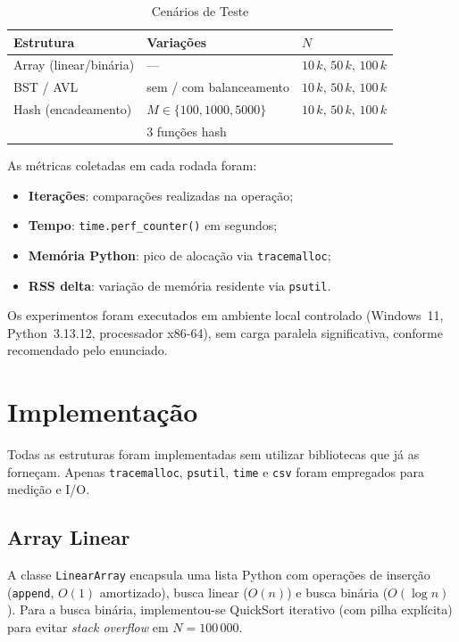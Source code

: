 \documentclass[conference,a4paper]{IEEEtran}
\begin{document}
\begin{table}[htbp]
  \caption{Cenários de Teste}
  \label{tab:cenarios}
  \centering
  \begin{tabular}{lll}
    \toprule
    Estrutura & Variações & $N$ \\
    \midrule
    Array (linear/binária) & — & $10\,k,\,50\,k,\,100\,k$ \\
    BST / AVL              & sem / com balanceamento & $10\,k,\,50\,k,\,100\,k$ \\
    Hash (encadeamento)    & $M \in \{100,1000,5000\}$ & $10\,k,\,50\,k,\,100\,k$ \\
                           & 3 funções hash & \\
    \bottomrule
  \end{tabular}
\end{table}

As métricas coletadas em cada rodada foram:

\begin{itemize}
  \item \textbf{Iterações}: comparações realizadas na operação;
  \item \textbf{Tempo}: \texttt{time.perf\_counter()} em segundos;
  \item \textbf{Memória Python}: pico de alocação via \texttt{tracemalloc};
  \item \textbf{RSS delta}: variação de memória residente via \texttt{psutil}.
\end{itemize}

Os experimentos foram executados em ambiente local controlado
(Windows~11, Python~3.13.12, processador x86-64), sem carga paralela
significativa, conforme recomendado pelo enunciado.

\section{Implementação}
\label{sec:implementacao}

Todas as estruturas foram implementadas sem utilizar bibliotecas que já
as forneçam. Apenas \texttt{tracemalloc}, \texttt{psutil},
\texttt{time} e \texttt{csv} foram empregados para medição e I/O.

\subsection{Array Linear}

A classe \texttt{LinearArray} encapsula uma lista Python com operações
de inserção (\texttt{append}, $O(1)$ amortizado), busca linear
($O(n)$) e busca binária ($O(\log n)$). Para a busca binária,
implementou-se QuickSort iterativo (com pilha explícita) para evitar
\textit{stack overflow} em $N = 100\,000$.
\end{document}
